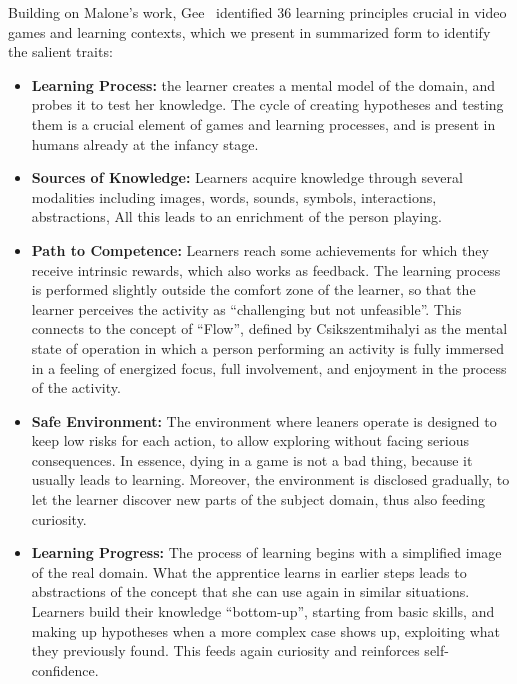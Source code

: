 Building on Malone's work, Gee~\cite{Gee2003} identified 36 learning principles crucial in video games and learning contexts, which we present in summarized form to identify the salient traits:

\begin{itemize}

\item\textbf{Learning Process:} the learner creates a mental model of the domain, and probes it to test her knowledge. The cycle of creating hypotheses and testing them is a crucial element of games and learning processes, and is present in humans already at the infancy stage.

\item\textbf{Sources of Knowledge:} Learners acquire knowledge through several modalities including images, words, sounds, symbols, interactions, abstractions, \etc All this leads to an enrichment of the person playing.

\item\textbf{Path to Competence:} Learners reach some achievements for which they receive intrinsic rewards, which also works as feedback. The learning process is performed slightly outside the comfort zone of the learner, so that the learner perceives the activity as ``challenging but not unfeasible''. This connects to the concept of ``Flow'', defined by Csikszentmihalyi \cite{Csik1990a} as the mental state of operation in which a person performing an activity is fully immersed in a feeling of energized focus, full involvement, and enjoyment in the process of the activity.

\item\textbf{Safe Environment:} The environment where leaners operate is designed to keep low risks for each action, to allow exploring without facing serious consequences. In essence, dying in a game is not a bad thing, because it usually leads to learning. Moreover, the environment is disclosed gradually, to let the learner discover new parts of the subject domain, thus also feeding curiosity.

\item\textbf{Learning Progress:} The process of learning begins with a simplified image of the real domain. What the apprentice learns in earlier steps leads to abstractions of the concept that she can use again in similar situations. Learners build their knowledge ``bottom-up'', starting from basic skills, and making up hypotheses when a more complex case shows up, exploiting what they previously found. This feeds again curiosity and reinforces self-confidence.

\end{itemize}

